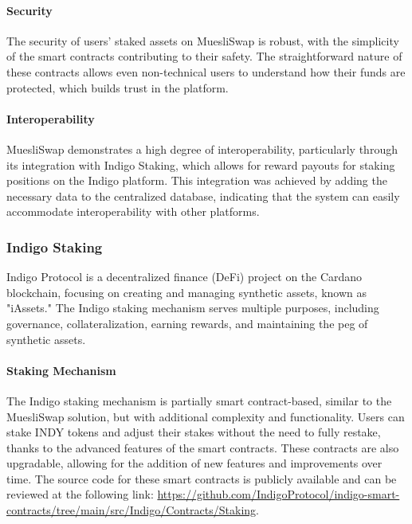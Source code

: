 \documentclass[12pt,parskip=full, tikz]{article}
\begin{document}
\paragraph{Security}

The security of users' staked assets on MuesliSwap is robust, with the simplicity of the smart contracts contributing to their safety. The straightforward nature of these contracts allows even non-technical users to understand how their funds are protected, which builds trust in the platform.

\paragraph{Interoperability}

MuesliSwap demonstrates a high degree of interoperability, particularly through its integration with Indigo Staking, which allows for reward payouts for staking positions on the Indigo platform. This integration was achieved by adding the necessary data to the centralized database, indicating that the system can easily accommodate interoperability with other platforms.


\subsubsection{Indigo Staking}

Indigo Protocol is a decentralized finance (DeFi) project on the Cardano blockchain, focusing on creating and managing synthetic assets, known as "iAssets." The Indigo staking mechanism serves multiple purposes, including governance, collateralization, earning rewards, and maintaining the peg of synthetic assets.

\paragraph{Staking Mechanism}

The Indigo staking mechanism is partially smart contract-based, similar to the MuesliSwap solution, but with additional complexity and functionality. Users can stake INDY tokens and adjust their stakes without the need to fully restake, thanks to the advanced features of the smart contracts. These contracts are also upgradable, allowing for the addition of new features and improvements over time. The source code for these smart contracts is publicly available and can be reviewed at the following link: \url{https://github.com/IndigoProtocol/indigo-smart-contracts/tree/main/src/Indigo/Contracts/Staking}.
\end{document}
